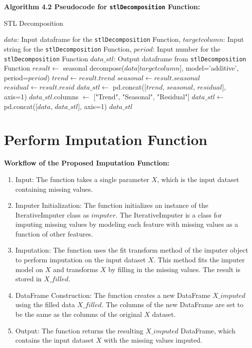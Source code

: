 \textbf{Algorithm 4.2 Pseudocode for \texttt{stlDecomposition} Function:}
\begin{algorithm}
\caption{STL Decomposition}
\begin{algorithmic}[1]
\Require $data$: Input dataframe for the \texttt{stlDecomposition} Function, $target column$: Input string for the \texttt{stlDecomposition} Function, $period$: Input number for the \texttt{stlDecomposition} Function
\Ensure $data\_stl$: Output dataframe from \texttt{stlDecomposition} Function
    \State $result \gets$ seasonal decompose($data$[$target column$], model='additive', period=$period$)
    \State $trend \gets result.trend$
    \State $seasonal \gets result.seasonal$
    \State $residual \gets result.resid$
    \State $data\_stl \gets$ pd.concat([$trend$, $seasonal$, $residual$], axis=1)
    \State $data\_stl$.columns $\gets$ ["Trend", "Seasonal", "Residual"]
    \State $data\_stl \gets$ pd.concat([$data$, $data\_stl$], axis=1)
    \State \Return $data\_stl$
\EndFunction
\end{algorithmic}
\end{algorithm}


\section{Perform Imputation Function}

\textbf{Workflow of the Proposed Imputation Function:}
\begin{enumerate}
    \item Input: The function takes a single parameter $X$, which is the input dataset containing missing values.
    \item Imputer Initialization: The function initializes an instance of the IterativeImputer class as $imputer$. The IterativeImputer is a class for imputing missing values by modeling each feature with missing values as a function of other features.
    \item Imputation: The function uses the fit transform method of the imputer object to perform imputation on the input dataset $X$. This method fits the imputer model on $X$ and transforms $X$ by filling in the missing values. The result is stored in $X\_filled$.
    \item DataFrame Construction: The function creates a new DataFrame $X\_imputed$ using the filled data $X\_filled$. The columns of the new DataFrame are set to be the same as the columns of the original $X$ dataset.
    \item Output: The function returns the resulting $X\_imputed$ DataFrame, which contains the input dataset $X$ with the missing values imputed.
\end{enumerate}

